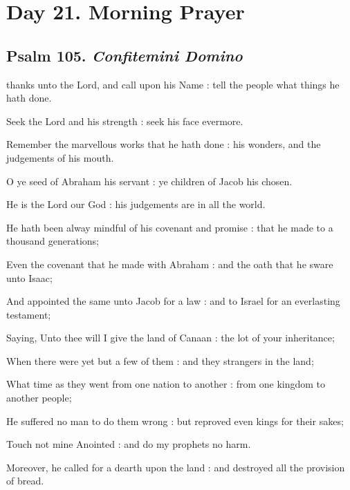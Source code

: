 \section*{Day 21. Morning Prayer}

\subsection{Psalm 105. \textit{Confitemini Domino}}

 thanks unto the Lord, and call upon his Name : tell the people what things he hath done.\par
{}
Seek the Lord and his strength : seek his face evermore.\par
{}Remember the marvellous works that he hath done : his wonders, and the judgements of his mouth.\par
{}O ye seed of Abraham his servant : ye children of Jacob his chosen.\par
{}He is the Lord our God : his judgements are in all the world.\par
{}He hath been alway mindful of his covenant and promise : that he made to a thousand generations;\par
{}Even the covenant that he made with Abraham : and the oath that he sware unto Isaac;\par
{}And appointed the same unto Jacob for a law : and to Israel for an everlasting testament;\par
{}Saying, Unto thee will I give the land of Canaan : the lot of your inheritance;\par
{}When there were yet but a few of them : and they strangers in the land;\par
{}What time as they went from one nation to another : from one kingdom to another people;\par
{}He suffered no man to do them wrong : but reproved even kings for their sakes;\par
{}Touch not mine Anointed : and do my prophets no harm.\par
{}Moreover, he called for a dearth upon the land : and destroyed all the provision of bread.\par
